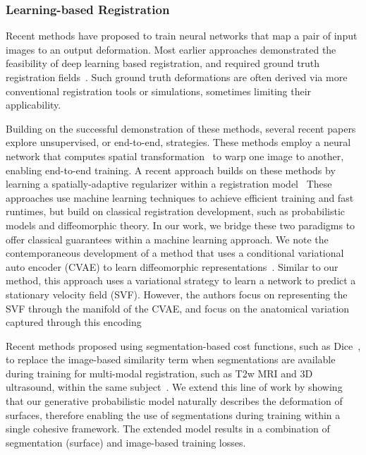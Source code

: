 \documentclass{article}
\newcommand{\citep}{\cite}
\begin{document}
\subsubsection{Learning-based Registration}
Recent methods have proposed to train neural networks that map a pair of input images to an output deformation. Most earlier approaches demonstrated the feasibility of deep learning based registration, and required ground truth registration fields~\citep{cao2017deformable,krebs2017,rohe2017,sokooti2017,yang2017}. Such ground truth deformations are often derived via more conventional registration tools or simulations, sometimes limiting their applicability. 

Building on the successful demonstration of these methods, several recent papers~\citep{balakrishnan2018a,balakrishnan2019,devos2017,devos2019,li2017} explore unsupervised, or end-to-end, strategies. These methods employ a neural network that computes spatial transformation~\citep{jaderberg2015} to warp one image to another, enabling end-to-end training. A recent approach builds on these methods by learning a spatially-adaptive regularizer within a
registration model~\citep{niethammer2019} These approaches use machine learning techniques to achieve efficient training and fast runtimes, but build on classical registration development, such as probabilistic models and diffeomorphic theory. In our work, we bridge these two paradigms to offer classical guarantees within a machine learning approach.
{\color{blue}We note the contemporaneous development of a method that uses a conditional variational auto encoder (CVAE) to learn diffeomorphic representations~\citep{krebs2018unsupervised,krebs2019learning}. Similar to our method, this approach uses a variational strategy to learn a network to predict a stationary velocity field (SVF). However, the authors focus on representing the SVF through the manifold of the CVAE, and focus on the anatomical variation captured through this encoding}


Recent methods proposed using segmentation-based cost functions, such as Dice~\citep{dice1945}, to replace the image-based similarity term when segmentations are available during training for multi-modal registration, such as T2w MRI and 3D ultrasound, within the same subject~\citep{hu2018weakly,hu2018label}. We extend this line of work by showing that our generative probabilistic model naturally describes the deformation of surfaces, therefore enabling the use of segmentations during training within a single cohesive framework. The extended model results in a combination of segmentation (surface) and image-based training losses.
\end{document}
